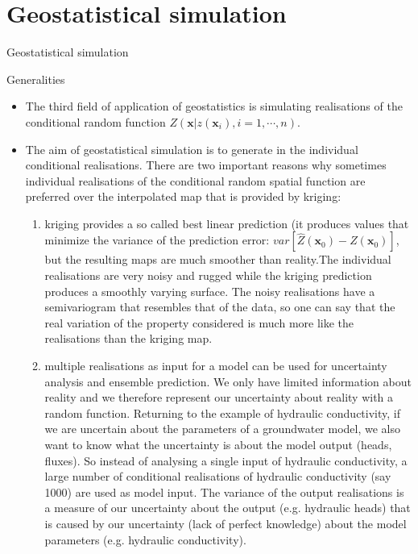 \documentclass[8pt]{beamer}
\renewcommand{\emph}[1]{\textcolor{myorange}{#1}}
\begin{document}
\section{Geostatistical simulation}
\begin{frame}{Geostatistical simulation}
     \begin{block}{Generalities}
    \end{block}
    \begin{itemize}
        \item The third field of application of \emph{geostatistics} is simulating realisations of the \emph{conditional random function} $Z(\mathbf{x} | z(\mathbf{x}_i), i=1,\cdots,n)$.
        \item The aim of \emph{geostatistical simulation} is to generate in the individual conditional realisations. There are two important reasons why sometimes individual realisations of the conditional \emph{random spatial function} are preferred over the interpolated map that is provided by \emph{kriging}:
            \begin{enumerate}
                \item \emph{kriging} provides a so called \emph{best linear prediction} (it produces values that minimize the \emph{variance of the prediction error}: $var[\hat{Z}(\mathbf{x}_0)-Z(\mathbf{x}_0)]$, but the resulting maps are much smoother than reality.The individual realisations are very noisy and rugged while the \emph{kriging prediction} produces a smoothly varying surface. The \emph{noisy realisations} have a \emph{semivariogram} that resembles that of the data, so one can say that the real variation of the property considered is much more like the realisations than the \emph{kriging map}.
                \item \emph{multiple realisations} as input for a model can be used for \emph{uncertainty analysis} and \emph{ensemble prediction}. We only have limited information about reality and we therefore represent our uncertainty about reality with a random function. Returning to the example of \emph{hydraulic conductivity}, if we are uncertain about the \emph{parameters} of a \emph{groundwater model}, we also want to know what the uncertainty is about the model output (heads, fluxes). So instead of analysing a single input of \emph{hydraulic conductivity}, a large number of conditional realisations of \emph{hydraulic conductivity} (say 1000) are used as model input. The \emph{variance} of the output realisations is a measure of our \emph{uncertainty} about the output (e.g. \emph{hydraulic heads}) that is caused by our \emph{uncertainty} (lack of perfect knowledge) about the \emph{model parameters} (e.g. \emph{hydraulic conductivity}).
            \end{enumerate}
    \end{itemize}
\end{frame}
\end{document}
